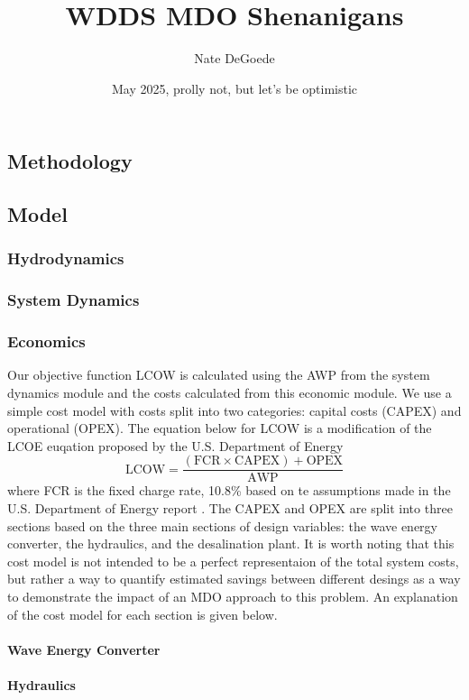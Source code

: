 \documentclass{article}
\title{WDDS MDO Shenanigans}
\author{Nate DeGoede}
\date{May 2025, prolly not, but let's be optimistic}
\begin{document}
\maketitle
\begin{multicols}{2}

\section{Methodology}
\subsection{Model}
\subsubsection{Hydrodynamics}
\subsubsection{System Dynamics}
\subsubsection{Economics}
Our objective function LCOW is calculated using the AWP from the system dynamics module and the costs calculated from this economic module. We use a simple cost model with costs split into two categories: capital costs (CAPEX) and operational (OPEX). The equation below for LCOW is a modification of the LCOE euqation proposed by the U.S. Department of Energy \cite{LCOE_DOE}
\begin{equation}
    \text{LCOW} = \frac{(\text{FCR}\times\text{CAPEX}) + \text{OPEX}}{\text{AWP}}
\end{equation}
where FCR is the fixed charge rate, 10.8\% based on te assumptions made in the U.S. Department of Energy report \cite{LCOE_DOE}. The CAPEX and OPEX are split into three sections based on the three main sections of design variables: the wave energy converter, the hydraulics, and the desalination plant. It is worth noting that this cost model is not intended to be a perfect representaion of the total system costs, but rather a way to quantify estimated savings between different desings as a way to demonstrate the impact of an MDO approach to this problem. An explanation of the cost model for each section is given below.
\paragraph{Wave Energy Converter}
\paragraph{Hydraulics}

\end{multicols}
\end{document}
